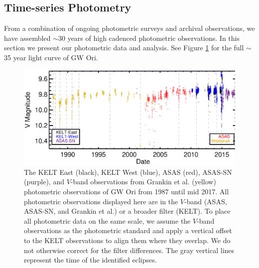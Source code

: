 \documentclass[twocolumn]{aastex61}
\newcommand{\todo}[1]{ \textcolor{red}{#1}}
\begin{document}
\subsection{Time-series Photometry}
From a combination of ongoing photometric surveys and archival observations, we have assembled $\sim$30 years of high cadenced photometric observations. In this section we present our photometric data and analysis. See Figure \ref{figure:FullLC} for the full $\sim$35 year light curve of GW Ori.


\begin{figure}[!ht]
\vspace{0.3in}
\centering\includegraphics[width=0.99\linewidth, trim = 0 5.8in 0 0.3in]{FULL_LC.eps}
\caption{The KELT East (black), KELT West (blue), ASAS (red), ASAS-SN (purple), and $V$-band observations from Grankin et al. (yellow) photometric observations of GW Ori from 1987 until mid 2017. All photometric observations displayed here are in the $V$-band (ASAS, ASAS-SN, and Grankin et al.) or a broader filter (KELT). To place all photometric data on the same scale, we assume the $V$-band observations as the photometric standard and apply a vertical offset to the KELT observations to align them where they overlap. We do not otherwise correct for the filter differences. The gray vertical lines represent the time of the identified eclipses.}
\label{figure:FullLC}
\end{figure}
\end{document}
